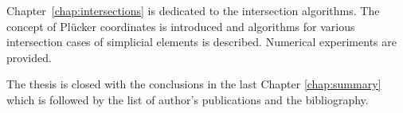 Chapter~\ref{chap:intersections} is dedicated to the intersection algorithms.
The concept of Pl\"ucker coordinates is introduced and algorithms for various intersection cases
of simplicial elements is described. Numerical experiments are provided.

The thesis is closed with the conclusions in the last Chapter \ref{chap:summary}
which is followed by the list of author's publications and the bibliography.













